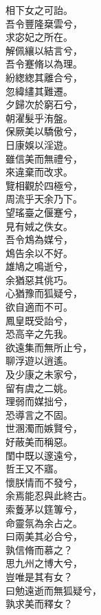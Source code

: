 \begin{pinyinscope}
\begin{shici}
相下女之可詒。\\
吾令豐隆椉雲兮，\\
求宓妃之所在。\\
解佩纕以結言兮，\\
吾令蹇脩以為理。\\
紛緫緫其離合兮，\\
忽緯繣其難遷。\\
夕歸次於窮石兮，\\
朝濯髮乎洧盤。\\
保厥美以驕傲兮，\\
日康娛以淫遊。\\
雖信美而無禮兮，\\
來違棄而改求。\\
覽相觀於四極兮，\\
周流乎天余乃下。\\
望瑤臺之偃蹇兮，\\
見有娀之佚女。\\
吾令鴆為媒兮，\\
鴆告余以不好。\\
雄鳩之鳴逝兮，\\
余猶惡其佻巧。\\
心猶豫而狐疑兮，\\
欲自適而不可。\\
鳳皇既受詒兮，\\
恐高辛之先我。\\
欲遠集而無所止兮，\\
聊浮遊以逍遙。\\
及少康之未家兮，\\
留有虞之二姚。\\
理弱而媒拙兮，\\
恐導言之不固。\\
世溷濁而嫉賢兮，\\
好蔽美而稱惡。\\
閨中既以邃遠兮，\\
哲王又不寤。\\
懷朕情而不發兮，\\
余焉能忍與此終古。\\
索藑茅以筳篿兮，\\
命靈氛為余占之。\\
曰兩美其必合兮，\\
孰信脩而慕之？\\
思九州之博大兮，\\
豈唯是其有女？\\
曰勉遠逝而無狐疑兮，\\
孰求美而釋女？\\

\end{shici}
\end{pinyinscope}
